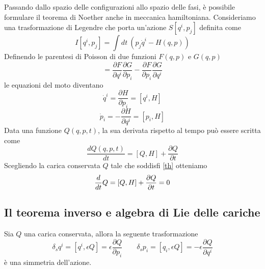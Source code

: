     Passando dallo spazio delle configurazioni allo spazio delle fasi, è possibile formulare il teorema di Noether anche in meccanica hamiltoniana. Consideriamo una trasformazione di Legendre che porta un'azione $S[q^i, p_j]$ definita come 
\begin{equation}
    I[q^i, p_j] = \int dt ~ (p_j \dot q^i - H(q, p))
\end{equation}
    Definendo le parentesi di Poisson di due funzioni $F(q, p)$ e $G(q, p)$
\begin{equation}
    [F, G] = \frac{\partial F }{\partial q^i} \frac{\partial G }{\partial p_i} - \frac{\partial F }{\partial p_i} \frac{\partial G }{\partial q^i} 
\end{equation}
    le equazioni del moto diventano 
\begin{equation}
    \dot q^i = \frac{\partial H} {\partial p_i} = [q^i, H]
\end{equation}
\begin{equation}
    \dot p_i = - \frac{\partial H} {\partial q^i} = [p_i, H]
\end{equation}
    Data una funzione $Q(q, p, t)$, la sua derivata rispetto al tempo può essere scritta come
\begin{equation}
    \frac{dQ(q, p, t)}{dt} = [Q, H] + \frac{\partial Q}{\partial t}
\end{equation}
    Scegliendo la carica conservata $Q$ tale che soddisfi \eqref{th} otteniamo
\begin{equation}
    \frac{d}{dt} Q = [Q, H] + \frac{\partial Q}{\partial t} = 0
\end{equation}

\subsection{Il teorema inverso e algebra di Lie delle cariche}
\begin{theorem}
    Sia $Q$ una carica conservata, allora la seguente trasformazione 
\begin{equation}
    \delta_s q^i = [q^i, \epsilon Q] = \epsilon \frac{\partial Q}{\partial p_i} \qquad \delta_s p_i = [q_i, \epsilon Q] = - \epsilon \frac{\partial Q}{\partial q^i}
\end{equation}
    è una simmetria dell'azione.
\end{theorem}

